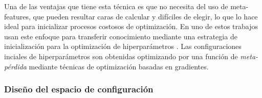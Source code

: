 Una de las ventajas que tiene esta técnica es que no necesita del uso de meta-features, que pueden resultar caras de calcular y difíciles de elegir, lo que lo hace ideal para inicializar procesos costosos de optimización. En uno de estos trabajos usan este enfoque para transferir conocimiento mediante una estrategia de inicialización para la optimización de hiperparámetros \cite{witsuba2015learning}. Las configuraciones inciales de hiperparámetros son obtenidas optimizando por una función de \textit{meta-pérdida} mediante técnicas de optimización basadas en gradientes.


%

\subsubsection{Diseño del espacio de configuración}



